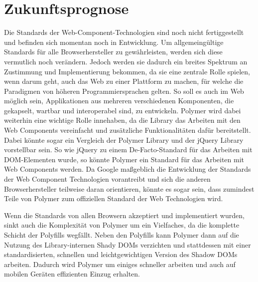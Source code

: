 \chapter{Zukunftsprognose}\label{zukunftsprognose}

Die Standards der Web-Component-Technologien sind noch nicht fertiggestellt und befinden sich momentan noch in Entwicklung. Um allgemeingültige Standards für alle Browserhersteller zu gewährleisten, werden sich diese vermutlich noch verändern. Jedoch werden sie dadurch ein breites Spektrum an Zustimmung und Implementierung bekommen, da sie eine zentrale Rolle spielen, wenn darum geht, auch das Web zu einer Plattform zu machen, für welche die Paradigmen von höheren Programmiersprachen gelten. So soll es auch im Web möglich sein, Applikationen aus mehreren verschiedenen Komponenten, die gekapselt, wartbar und interoperabel sind, zu entwickeln. Polymer wird dabei weiterhin eine wichtige Rolle innehaben, da die Library das Arbeiten mit den Web Components vereinfacht und zusätzliche Funktionalitäten dafür bereitstellt. Dabei könnte sogar ein Vergleich der Polymer Library und der jQuery Library vorstellbar sein. So wie jQuery zu einem De-Facto-Standard für das Arbeiten mit \ac{DOM}-Elementen wurde, so könnte Polymer ein Standard für das Arbeiten mit Web Components werden. Da Google maßgeblich die Entwicklung der Standards der Web Component Technologien vorantreibt und sich die anderen Browserhersteller teilweise daran orientieren, könnte es sogar sein, dass zumindest Teile von Polymer zum offiziellen Standard der Web Technologien wird.

Wenn die Standards von allen Browsern akzeptiert und implementiert wurden, sinkt auch die Komplexität von Polymer um ein Vielfaches, da die komplette Schicht der Polyfills wegfällt. Neben den Polyfills kann Polymer dann auf die Nutzung des Library-internen Shady \ac{DOM}s verzichten und stattdessen mit einer standardisierten, schnellen und leichtgewichtigen Version des Shadow \ac{DOM}s arbeiten. Dadurch wird Polymer um einiges schneller arbeiten und auch auf mobilen Geräten effizienten Einzug erhalten.

